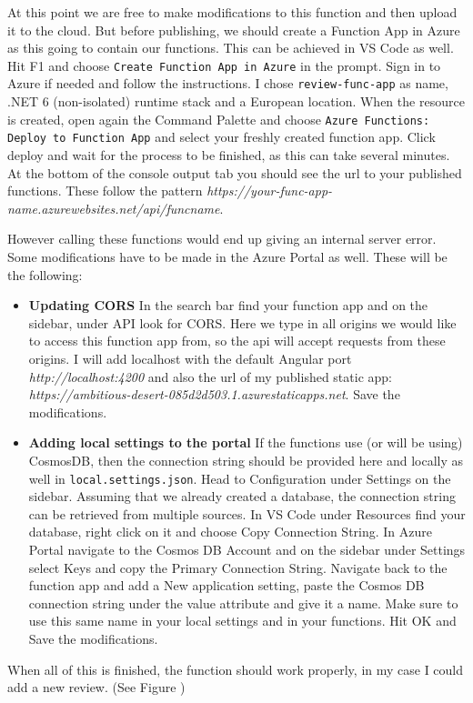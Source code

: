 At this point we are free to make modifications to this function and then upload it to the cloud. But before publishing, we should create a Function App in Azure as this going to contain our functions. This can be achieved in VS Code as well. Hit F1 and choose \verb+Create Function App in Azure+ in the prompt. Sign in to Azure if needed and follow the instructions. I chose \verb+review-func-app+ as name, .NET 6 (non-isolated) runtime stack and a European location. When the resource is created, open again the Command Palette and choose \verb+Azure Functions: Deploy to Function App+ and select your freshly created function app. Click deploy and wait for the process to be finished, as this can take several minutes. At the bottom of the console output tab you should see the url to your published functions. These follow the pattern
\emph{https://your-func-app-name.azurewebsites.net/api/funcname}.

However calling these functions would end up giving an internal server error. Some modifications have to be made in the Azure Portal as well. These will be the following:
\begin{itemize}
	\item \textbf{Updating CORS}
	 In the search bar find your function app and on the sidebar, under API look for CORS. Here we type in all origins we would like to access this function app from, so the api will accept requests from these origins. I will add localhost with the default Angular port \emph{http://localhost:4200} and also the url of my published static app: \emph{https://ambitious-desert-085d2d503.1.azurestaticapps.net}. Save the modifications.
	 
	\item \textbf{Adding local settings to the portal}\label{LocalSettings}
	If the functions use (or will be using) CosmosDB, then the connection string should be provided here and locally as well in \verb+local.settings.json+. Head to Configuration under Settings on the sidebar. Assuming that we already created a database, the connection string can be retrieved from multiple sources. In VS Code under Resources find your database, right click on it and choose Copy Connection String. In Azure Portal navigate to the Cosmos DB Account and on the sidebar under Settings select Keys and copy the Primary Connection String. Navigate back to the function app and add a New application setting, paste the Cosmos DB connection string under the value attribute and give it a name. Make sure to use this same name in your local settings and in your functions. Hit OK and Save the modifications.
\end{itemize}
  When all of this is finished, the function should work properly, in my case I could add a new review. (See Figure )

